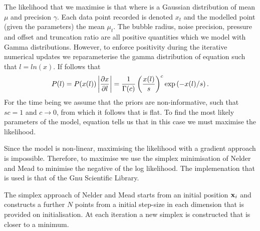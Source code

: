 The likelihood that we maximise is that
where 
is a Gaussian distribution of mean $\mu$ and precision  $\gamma$.
Each data point recorded is denoted $x_t$ and the modelled point (given the parameters) the mean  $\mu_t$.
The bubble radius, noise precision, pressure and offset and truncation ratio are all positive quantities which we model with Gamma distributions.
However, to enforce positivity during the iterative numerical updates 
we reparameterise the gamma distribution of equation  such that $l = ln(x)$.
If follows that
\begin{align}
  P(l) = P(x(l))\left| \frac{\partial x}{\partial l} \right| = \frac{1}{\Gamma(c)}\left( \frac{x(l)}{s} \right)^c\exp\left( -x(l)/s \right).
\label{eqn:logGamma}
\end{align}
For the time being we assume that the priors are non-informative, such that $sc = 1$ and $c\rightarrow 0$,
from which it follows that  is flat.
To find the most likely parameters of the model, 
equation  tells us that in this case we must  maximise the likelihood.



Since the model is non-linear,
maximising the likelihood with a gradient approach is impossible.
Therefore, to maximise 
we use the simplex minimisation of Nelder and Mead\cite{Nelder1965}
to minimise the negative of the log likelihood.
The implemenation that is used is that of the Gnu Scientific Library.

The simplex approach of Nelder and Mead\cite{Nelder1965} starts from an initial position $\mathbf{x}_i$ and
constructs a further $N$ points from a initial step-size in each dimension that is provided on initialisation.
At each iteration a new simplex is constructed that is closer to a minimum.


